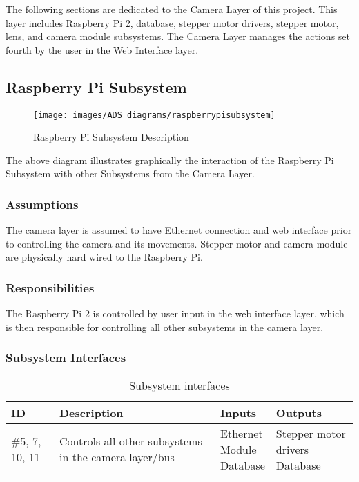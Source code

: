 The following sections are dedicated to the Camera Layer of this project. This layer includes Raspberry Pi 2, database, stepper motor drivers, stepper motor, lens, and camera module subsystems. The Camera Layer manages the actions set fourth by the user in the Web Interface layer.

\subsection{Raspberry Pi Subsystem}

\begin{figure}[h!]
	\centering
 	\texttt{[image: images/ADS diagrams/raspberrypisubsystem]}
 \caption{Raspberry Pi Subsystem Description}
\end{figure}

The above diagram illustrates graphically the interaction of the Raspberry Pi Subsystem with other Subsystems from the Camera Layer.

\subsubsection{Assumptions}
The camera layer is assumed to have Ethernet connection and web interface prior to controlling the camera and its movements. Stepper motor and camera module are physically hard wired to the Raspberry Pi. 

\subsubsection{Responsibilities}
The Raspberry Pi 2 is controlled by user input in the web interface layer, which is then responsible for controlling all other subsystems in the camera layer.

\subsubsection{Subsystem Interfaces}

\begin {table}[H]
\caption {Subsystem interfaces} 
\begin{center}
    \begin{tabular}{ | p{1cm} | p{6cm} | p{3cm} | p{3cm} |}
    \hline
    ID & Description & Inputs & Outputs \\ \hline
    \#5, 7, 10, 11 & Controls all other subsystems in the camera layer/bus & \pbox{3cm}{Ethernet \\ Module \\ Database } & \pbox{3cm}{Stepper motor drivers \\ Database}  \\ \hline
   
    
    \end{tabular}
\end{center}
\end{table}



